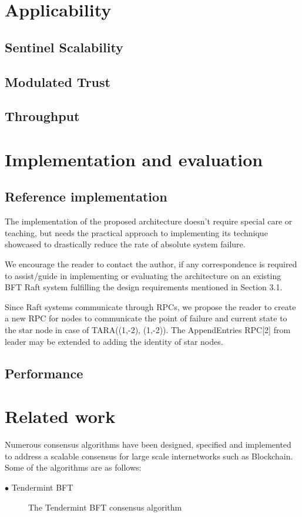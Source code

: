 \documentclass[]{article}
\begin{document}
\section{Applicability}
\subsection{Sentinel Scalability}
\subsection{Modulated Trust}
\subsection{Throughput}

\section{Implementation and evaluation}
\subsection{Reference implementation}
The implementation of the proposed architecture doesn’t require special care or teaching, but needs the practical approach to implementing its technique showcased to drastically reduce the rate of absolute system failure. 

We encourage the reader to contact the author, if any correspondence is required to assist/guide in implementing or evaluating the architecture on an existing BFT Raft system fulfilling the design requirements mentioned in Section 3.1.

Since Raft systems communicate through RPCs, we propose the reader to create a new RPC for nodes to communicate the point of failure and current state to the star node in case of TARA((1,-2), (1,-2)). The AppendEntries RPC[2] from leader may be extended to adding the identity of star nodes.

\subsection{Performance}

\section{Related work}
Numerous consensus algorithms have been designed, specified and implemented to address a scalable consensus for large scale internetworks such as Blockchain. Some of the algorithms are as follows:
\begin{description}
	\item[$\bullet$ Tendermint BFT] The Tendermint BFT consensus algorithm
\end{description}
\end{document}
